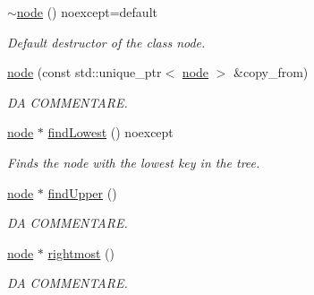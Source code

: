 \begin{DoxyCompactItemize}
\hyperlink{structbst_1_1node_a80c9e025d6735588e79d8de5042a8ceb}{$\sim$node} () noexcept=default
\begin{DoxyCompactList}\small\item\em Default destructor of the class node. \end{DoxyCompactList}\item 
\hyperlink{structbst_1_1node_a53df8bc80453eb24c19a3596e0959205}{node} (const std\+::unique\+\_\+ptr$<$ \hyperlink{structbst_1_1node}{node} $>$ \&copy\+\_\+from)
\begin{DoxyCompactList}\small\item\em DA C\+O\+M\+M\+E\+N\+T\+A\+RE. \end{DoxyCompactList}\item 
\hyperlink{structbst_1_1node}{node} $\ast$ \hyperlink{structbst_1_1node_ae458e2ef45eab2b7ac3d13e361b12e42}{find\+Lowest} () noexcept
\begin{DoxyCompactList}\small\item\em Finds the node with the lowest key in the tree. \end{DoxyCompactList}\item 
\hyperlink{structbst_1_1node}{node} $\ast$ \hyperlink{structbst_1_1node_a95c26cd3d70b4b8c97506198c1415f94}{find\+Upper} ()
\begin{DoxyCompactList}\small\item\em DA C\+O\+M\+M\+E\+N\+T\+A\+RE. \end{DoxyCompactList}\item 
\hyperlink{structbst_1_1node}{node} $\ast$ \hyperlink{structbst_1_1node_ad76e8929422404ad9dd2459ccbc9ee7d}{rightmost} ()
\begin{DoxyCompactList}\small\item\em DA C\+O\+M\+M\+E\+N\+T\+A\+RE. \end{DoxyCompactList}\end{DoxyCompactItemize}
